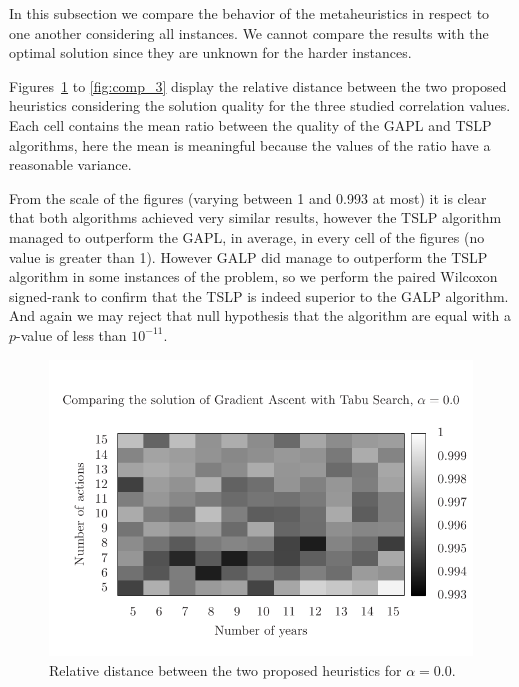 In this subsection we compare the behavior of the metaheuristics in respect to one another
considering all instances. We cannot compare the results with the optimal solution since they are unknown for the harder instances.

Figures~\ref{fig:comp_1} to \ref{fig:comp_3} display the relative distance between the two proposed 
heuristics considering the solution quality for the three studied correlation values.
Each cell contains the mean ratio between the quality of the GAPL and TSLP algorithms,
here the mean is meaningful because the values of the ratio have a reasonable variance.

From the scale of the figures (varying between 1 and 0.993 at most) it is clear
that both algorithms achieved very similar results, however the TSLP algorithm
managed to outperform the GAPL, in average, in every cell of the figures (no value is greater than 1).
However GALP did manage to outperform the TSLP algorithm in some instances of the problem,
so we perform the paired Wilcoxon signed-rank to confirm that the TSLP is indeed superior
to the GALP algorithm. And again we may reject that null hypothesis that the algorithm
are equal with a $p$-value of less than $10^{-11}$.

\begin{figure}
\centering
\includegraphics[scale=0.73, trim=0.75cm 0cm 0 2cm, clip=true]{imgs/comp_very_hard_sg_ts.pdf}
\caption{Relative distance between the two proposed heuristics for $\alpha=0.0$.}
\label{fig:comp_1}
\end{figure}


